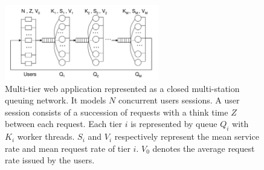 \begin{figure}[H]
    \centering
    \includegraphics[width=0.6\textwidth]{chapter-related-work/images-decomp/sla-decomp-multi-queue.png}
    \caption{Multi-tier web application represented as a closed multi-station queuing network. It models $N$ concurrent users sessions. A user session consists of a succession of requests with a think time $Z$  between each request. Each tier $i$ is represented by queue $Q_{i}$ with $K_{i}$ worker threads. $S_{i}$ and $V_{i}$ respectively represent the mean service rate and mean request rate of tier $i$. $V_{0}$ denotes the average request rate issued by the users.~\cite{chen2007sla}}
    \label{fig:decomp-muti-queue}
\end{figure}

